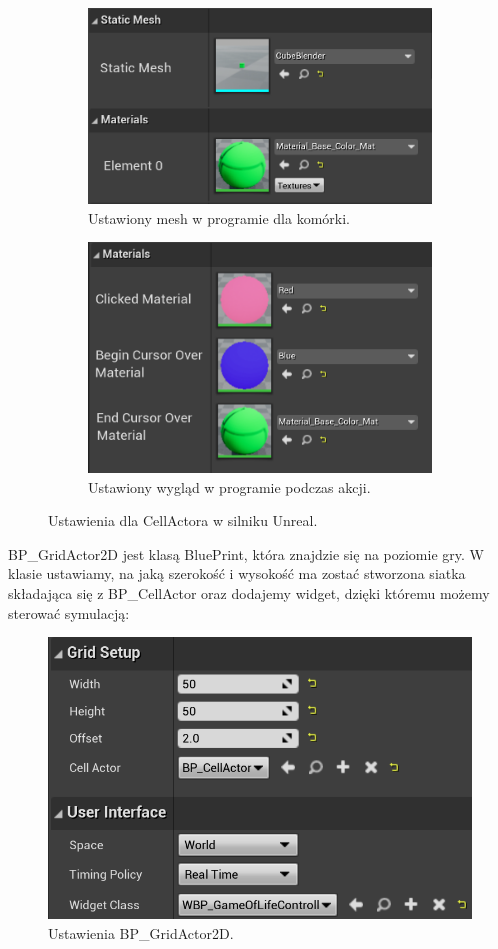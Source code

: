 \documentclass[a4paper,12pt,reqno]{article}
\begin{document}
\begin{figure}[!ht]%
	\centering
	\begin{subfigure}{.7\textwidth}
		\centering
		\includegraphics[width=0.8\linewidth]{graphics/gameoflife/CellActorInUE_1.png}
		\caption{Ustawiony mesh w programie dla komórki.}	
		\label{ref:subref_a}
	\end{subfigure}%
	
	\begin{subfigure}{.7\textwidth}
		\centering
		\includegraphics[width=0.8\linewidth]{graphics/gameoflife/CellActorInUE_2.png}
		\caption{Ustawiony wygląd w programie podczas akcji.}
		\label{ref:subref_b}
	\end{subfigure}%
	

\caption{Ustawienia dla CellActora w silniku Unreal.}
\label{ref:ref}
\end{figure}

BP\_GridActor2D jest klasą BluePrint, która znajdzie się na poziomie gry. W klasie ustawiamy, na jaką szerokość i wysokość ma zostać stworzona siatka składająca się z BP\_CellActor oraz dodajemy widget, dzięki któremu możemy sterować symulacją:

\begin{figure}[H]%
\centering
\includegraphics[width=0.6\columnwidth]{graphics/gameoflife/GridActor2DInUE_1.png}
\caption{Ustawienia BP\_GridActor2D.
\label{BPExample}}%
%
\qquad
\end{figure}  
\end{document}
